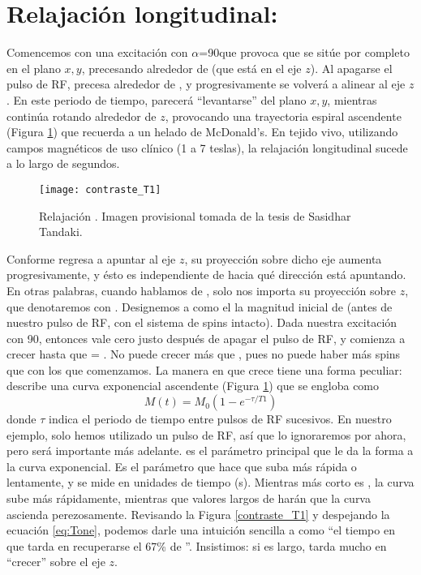 \section{Relajación longitudinal: \Tone}
Comencemos con una excitación con $\alpha$=90\degrees que provoca que \M se 
sitúe por completo en el plano $x,y$, precesando alrededor de \Bzero (que está 
en el eje $z$). Al apagarse el pulso de RF, \M precesa alrededor de \Bzero, y 
 progresivamente se volverá a alinear al eje $z$. En este periodo de tiempo, \M 
parecerá ``levantarse'' del plano $x,y$, mientras continúa rotando alrededor de $z$, provocando una trayectoria espiral ascendente (Figura \ref{fig:T1}) que recuerda a un helado de McDonald's. En tejido vivo, utilizando campos magnéticos de uso clínico (1 a 7 teslas), la relajación longitudinal \Tone sucede a lo largo de segundos. 


\begin{figure}[htb]
\begin{figg}
   \texttt{[image: contraste\_T1]}
   \caption{Relajación \Tone. Imagen provisional tomada de la tesis de Sasidhar Tandaki. \citep{tadanki2018}}
 \label{fig:T1}
 \end{figg}
\end{figure}



Conforme \M regresa a apuntar al eje $z$, su proyección sobre dicho eje aumenta progresivamente, y ésto es independiente de hacia qué dirección está apuntando. En otras palabras, cuando hablamos de \Tone, solo nos importa su proyección sobre $z$, que denotaremos con \Mz. Designemos a \Mzero como el la magnitud inicial de \M (antes de nuestro pulso de RF, con el sistema de spins intacto). Dada nuestra excitación con 90\degrees, entonces \Mz vale cero justo después de apagar el pulso de RF, y comienza a crecer hasta que \Mz = \Mzero. No puede crecer más que \Mzero, pues no puede haber más spins que con los que comenzamos. La manera en que \Mz crece tiene una forma peculiar: describe una curva exponencial ascendente (Figura \ref{fig:T1}) que se engloba como
\begin{equation}
\label{eq:Tone}
 M(t) = M_0(1 - e^{-\tau/T1})
\end{equation}
donde $\tau$ indica el periodo de tiempo entre pulsos de RF sucesivos. En nuestro ejemplo, solo hemos utilizado un pulso de RF, así que lo ignoraremos por ahora, pero será importante más adelante.  \Tone es el parámetro principal que le da la forma a la curva exponencial. Es el parámetro que hace que suba más rápida o lentamente, y se mide en unidades de tiempo (s). Mientras más corto es \Tone, la curva sube más rápidamente, mientras que valores largos de \Tone harán que la curva ascienda perezosamente. Revisando la Figura \ref{contraste_T1} y despejando la ecuación \ref{eq:Tone},  podemos darle una intuición sencilla a \Tone como ``el tiempo en que tarda en recuperarse el 67\% de \Mzero''. Insistimos: si \Tone es largo, \Mz tarda mucho en ``crecer'' sobre el eje $z$. 

